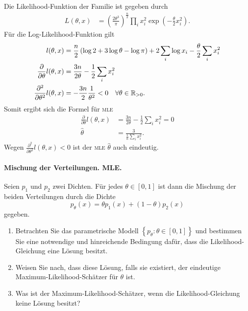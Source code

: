 Die Likelihood-Funktion der Familie ist gegeben durch
\begin{align*}
	L(\theta, x) &= \left( \frac{2\theta^3}{\pi} \right)^\frac{n}{2} 
	\prod_i x_i^2 \exp\left( - \frac{\theta}{2}x_i^2 \right).
\end{align*}
Für die Log-Likelihood-Funktion gilt
\begin{align*}
	l(\theta,x) &= \frac{n}{2}\left( \log 2 + 3 \log \theta - \log \pi \right) + 2\sum_{i}^{} \log x_i - \frac{\theta}{2}\sum_{i}^{} x_i^2 \\
	\frac{\partial}{\partial \theta} l(\theta,x) &= 
	\frac{3n}{2 \theta}  - \frac{1}{2}\sum_{i}^{} x_i^2 \\
	\frac{\partial^2}{\partial \theta^2} l(\theta,x) &= - \frac{3n}{2} \frac{1}{\theta^2} < 0 \quad \forall \theta\in\mathbb R_{>0}.
\end{align*}
Somit ergibt sich die Formel für \textsc{mle} 
\begin{align*}
	\frac{\partial}{\partial \theta} l(\theta,x) &= \frac{3n}{2 \theta}  - \frac{1}{2}\sum_{i}^{} x_i^2 = 0 \\
	\hat\theta &=  \frac{3}{\frac{1}{n} \sum_{i}^{} x_i^2}.
\end{align*}
Wegen $ \frac{\partial^2}{\partial \theta^2} l(\theta,x) <0$ ist der \textsc{mle} $\hat\theta$ auch eindeutig.





\paragraph{Mischung der Verteilungen. MLE.}
Seien $p_1$ und $p_2$ zwei Dichten. Für jedes $\theta\in\left[ 0,1 \right]$ ist dann die Mischung
der beiden Verteilungen durch die Dichte
\begin{equation*}
	p_\theta(x) = \theta p_1(x) + (1-\theta)p_2(x)
\end{equation*}
gegeben. 
\begin{enumerate}
    \item Betrachten Sie das parametrische Modell $\left\{ p_\theta : \theta
        \in \left[ 0,1 \right] \right\}$ und bestimmen Sie eine notwendige und
        hinreichende Bedingung dafür, dass die Likelihood-Gleichung eine Lösung
        besitzt.
    \item Weisen Sie nach, dass diese Lösung, falls sie existiert, der
        eindeutige Maximum-Likelihood-Schätzer für $\theta$ ist.
    \item Was ist der Maximum-Likelihood-Schätzer, wenn die
        Likelihood-Gleichung keine Lösung besitzt?
\end{enumerate}

